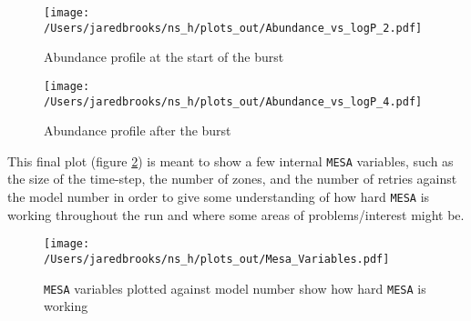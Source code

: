 \documentclass{article}
\begin{document}
        \begin{figure}[H]
                \begin{minipage}[b]{0.5\linewidth}
                       \centering
                       \texttt{[image: /Users/jaredbrooks/ns\_h/plots\_out/Abundance\_vs\_logP\_2.pdf]}
                       \caption{Abundance profile at the start of the burst}
                       \label{fig:5}
                \end{minipage}
                \hspace{0cm}
                \begin{minipage}[b]{0.5\linewidth}
                       \centering
                       \texttt{[image: /Users/jaredbrooks/ns\_h/plots\_out/Abundance\_vs\_logP\_4.pdf]}
                       \caption{Abundance profile after the burst}
                       \label{fig:6}
                \end{minipage}
        \end{figure}

        \pagebreak

        This final plot (figure \ref{fig:7}) is meant to show a few internal \texttt{MESA} variables, such as the size of the time-step, the number of zones, and the number of retries against the model number in order to give some understanding of how hard \texttt{MESA} is working throughout the run and where some areas of problems/interest might be.

        \begin{figure}[H]
                \centering
                \texttt{[image: /Users/jaredbrooks/ns\_h/plots\_out/Mesa\_Variables.pdf]}
                \caption{\texttt{MESA} variables plotted against model number show how hard \texttt{MESA} is working}
                \label{fig:7}
        \end{figure}
\end{document}
